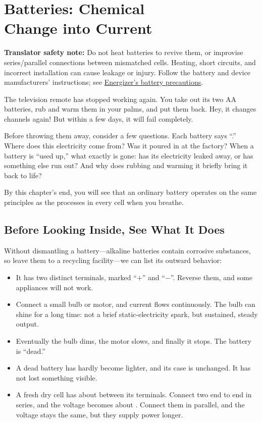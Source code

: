 \chapter[Batteries: Chemical Change into Current]{Batteries: Chemical\protect\\ Change into Current}

\begin{kaichang}
\textbf{Translator safety note:} Do not heat batteries to revive them, or improvise series/parallel connections between mismatched cells. Heating, short circuits, and incorrect installation can cause leakage or injury. Follow the battery and device manufacturers' instructions; see \href{https://oem.energizer.com/english/dos-donts/}{Energizer's battery precautions}.

The television remote has stopped working again. You take out its two AA batteries, rub and warm them in your palms, and put them back. Hey, it changes channels again! But within a few days, it will fail completely.

Before throwing them away, consider a few questions. Each battery says ``.'' Where does this electricity come from? Was it poured in at the factory? When a battery is ``used up,'' what exactly is gone: has its electricity leaked away, or has something else run out? And why does rubbing and warming it briefly bring it back to life?

By this chapter's end, you will see that an ordinary battery operates on the same principles as the processes in every cell when you breathe.
\end{kaichang}

\section{Before Looking Inside, See What It Does}

Without dismantling a battery---alkaline batteries contain corrosive substances, so leave them to a recycling facility---we can list its outward behavior:

\begin{itemize}[itemsep=2pt]
\item It has two distinct terminals, marked ``$+$'' and ``$-$''. Reverse them, and some appliances will not work.
\item Connect a small bulb or motor, and current flows continuously. The bulb can shine for a long time: not a brief static-electricity spark, but sustained, steady output.
\item Eventually the bulb dims, the motor slows, and finally it stops. The battery is ``dead.''
\item A dead battery has hardly become lighter, and its case is unchanged. It has not lost something visible.
\item A fresh dry cell has about  between its terminals. Connect two end to end in series, and the voltage becomes about . Connect them in parallel, and the voltage stays the same, but they supply power longer.
\end{itemize}

